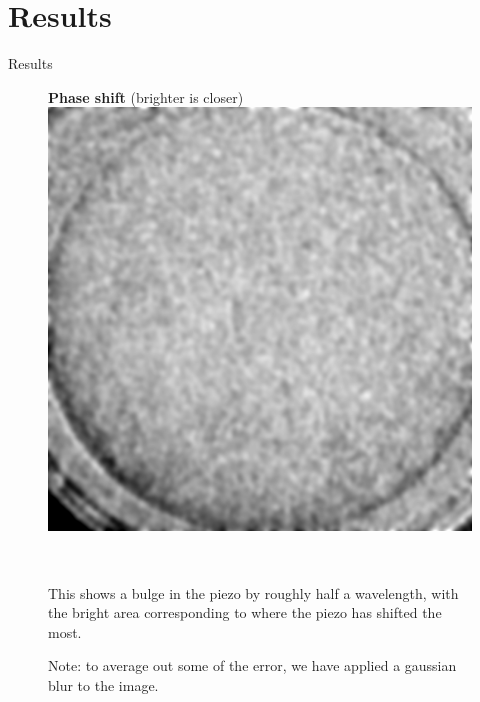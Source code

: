 \documentclass[pdf]{beamer}
\begin{document}
\section{Results}
\begin{frame}{Results}

\begin{figure}[!htb]
    \centering
    \begin{minipage}{.6\textwidth}
    	\centering
		{\bf Phase shift} (brighter is closer)\\
		\includegraphics[width=\textwidth]{result.png}
    \end{minipage}~
    \begin{minipage}{0.4\textwidth}
    	This shows a bulge in the piezo by roughly half a wavelength, with the bright area corresponding to where the piezo has shifted the most.

    	\vspace{0.3cm}
        Note: to average out some of the error, we have applied a gaussian blur to the image.
    \end{minipage}
\end{figure}

\end{frame}
\end{document}
